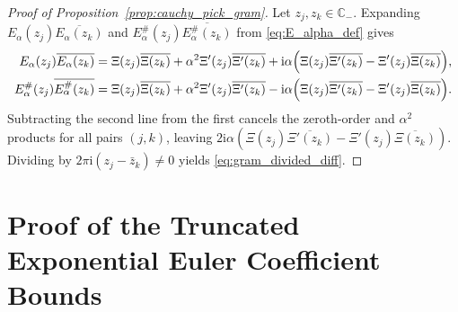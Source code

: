 \documentclass[11pt,reqno]{amsart}
\theoremstyle{definition}
\theoremstyle{remark}
\numberwithin{equation}{section}
\newcommand{\ii}{\mathrm{i}}
\begin{document}
\begin{proof}[Proof of Proposition~\ref{prop:cauchy_pick_gram}]
Let $z_j, z_k \in \mathbb{C}_-$. Expanding $E_\alpha(z_j)\overline{E_\alpha(z_k)}$ and $E_\alpha^\#(z_j)\overline{E_\alpha^\#(z_k)}$ from \eqref{eq:E_alpha_def} gives
\begin{align*}
  E_\alpha(z_j)\overline{E_\alpha(z_k)}
  &= \Xi(z_j)\overline{\Xi(z_k)} + \alpha^2\Xi'(z_j)\overline{\Xi'(z_k)}
     + \ii\alpha\Bigl(\Xi(z_j)\overline{\Xi'(z_k)} - \Xi'(z_j)\overline{\Xi(z_k)}\Bigr), \\
  E_\alpha^\#(z_j)\overline{E_\alpha^\#(z_k)}
  &= \Xi(z_j)\overline{\Xi(z_k)} + \alpha^2\Xi'(z_j)\overline{\Xi'(z_k)}
     - \ii\alpha\Bigl(\Xi(z_j)\overline{\Xi'(z_k)} - \Xi'(z_j)\overline{\Xi(z_k)}\Bigr).
\end{align*}
Subtracting the second line from the first cancels the zeroth-order and $\alpha^2$ products for all pairs $(j,k)$, leaving $2\ii\alpha(\Xi(z_j)\overline{\Xi'(z_k)} - \Xi'(z_j)\overline{\Xi(z_k)})$. Dividing by $2\pi\ii(z_j - \bar{z}_k) \neq 0$ yields \eqref{eq:gram_divided_diff}.
\end{proof}

\section{Proof of the Truncated Exponential Euler Coefficient Bounds}\label{app:overshoot_proof}
\end{document}
